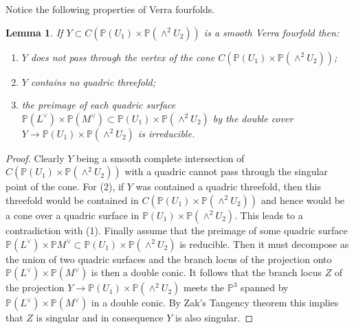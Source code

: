 \documentclass[a4paper,11pt]{amsart}
\newtheorem{lem}[thm]{Lemma}
\theoremstyle{definition}
\numberwithin{equation}{section}
\numberwithin{equation}{section} \theoremstyle{definition}
\begin{document}
Notice the following properties of Verra fourfolds.
\begin{lem}\label{smooth Verra} If $Y\subset C({{\mathbb{P}}}( U_1)\times {{\mathbb{P}}}(\wedge^2 U_2))$ is a smooth Verra fourfold then:
\begin{enumerate}
\item $Y$ does not pass through the vertex of the cone $C({{\mathbb{P}}}( U_1)\times {{\mathbb{P}}}(\wedge^2 U_2))$;
\item $Y$ contains no quadric threefold;
\item the preimage of each quadric surface ${{\mathbb{P}}}(L^{\vee})\times {{\mathbb{P}}} (M^{\vee})\subset {{\mathbb{P}}}( U_1)\times {{\mathbb{P}}}(\wedge^2 U_2)$ by the double cover $Y\to {{\mathbb{P}}}( U_1)\times {{\mathbb{P}}}(\wedge^2 U_2)$ is irreducible.
\end{enumerate}
\end{lem}
\begin{proof} Clearly $Y$ being a smooth complete intersection of $C({{\mathbb{P}}}( U_1)\times {{\mathbb{P}}}(\wedge^2 U_2))$ with a quadric cannot pass through the singular point of the cone. 
For (2), if $Y$ was contained a quadric threefold, then this threefold would be contained in $C({{\mathbb{P}}}( U_1)\times {{\mathbb{P}}}( \wedge^2 U_2))$ and hence would be a cone over a quadric surface in ${{\mathbb{P}}}(U_1)\times {{\mathbb{P}}}(\wedge^2 U_2)$. This  leads to a contradiction with (1). 
Finally assume that the preimage of some quadric surface ${{\mathbb{P}}}(L^{\vee})\times {{\mathbb{P}}} M^{\vee}\subset {{\mathbb{P}}}(U_1)\times {{\mathbb{P}}}(\wedge^2 U_2)$ is reducible. Then it must decompose as the union of two quadric surfaces and the branch locus of the projection onto  ${{\mathbb{P}}}(L^{\vee})\times {{\mathbb{P}}} (M^{\vee})$ is then a double conic. It follows that the branch locus $Z$ of the projection $Y\to {{\mathbb{P}}}(U_1)\times {{\mathbb{P}}}(\wedge^2  U_2)$ meets the ${{\mathbb{P}}}^3$ spanned by ${{\mathbb{P}}}(L^{\vee})\times {{\mathbb{P}}} (M^{\vee})$  in a double conic. By Zak's Tangency theorem \cite{Zak} this implies that $Z$ is singular and in consequence $Y$ is also singular.
\end{proof}
 
\end{document}
